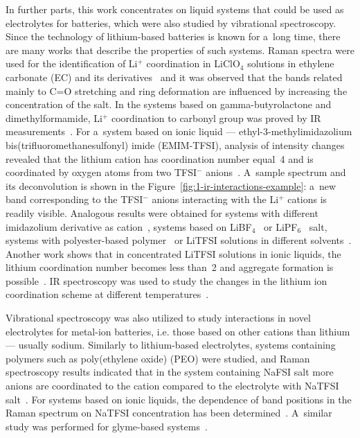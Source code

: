 In further parts, this work concentrates on liquid systems that could be used as electrolytes for batteries, which were also studied by vibrational spectroscopy. Since the technology of lithium-based batteries is known for a~long time, there are many works that describe the properties of such systems. Raman spectra were used for the identification of Li$^{+}$ coordination in LiClO$_4$ solutions in ethylene carbonate (EC) and its derivatives~\cite{li-interactions-1,li-interactions-2} and it was observed that the bands related mainly to C=O stretching and ring deformation are influenced by increasing the concentration of the salt. In the systems based on gamma-butyrolactone and dimethylformamide, Li$^{+}$ coordination to carbonyl group was proved by IR measurements~\cite{li-interactions-3}. For a~system based on ionic liquid --- ethyl-3-methylimidazolium bis(trifluoromethanesulfonyl) imide (EMIM-TFSI), analysis of intensity changes revealed that the lithium cation has coordination number equal~4 and is coordinated by oxygen atoms from two TFSI$^{-}$ anions~\cite{li-interactions-4}. A~sample spectrum and its deconvolution is shown in the Figure~\ref{fig:1-ir-interactions-example}: a~new band corresponding to the TFSI$^{-}$ anions interacting with the Li$^{+}$ cations is readily visible. Analogous results were obtained for systems with different imidazolium derivative as cation~\cite{li-interactions-7}, systems based on LiBF$_4$~\cite{li-interactions-8} or LiPF$_6$~\cite{li-interactions-9} salt, systems with polyester-based polymer~\cite{li-interactions-5} or LiTFSI solutions in different solvents~\cite{li-interactions-6}. Another work shows that in concentrated LiTFSI solutions in ionic liquids, the lithium coordination number becomes less than~2 and aggregate formation is possible~\cite{lib-vibrational-modeling,li-interactions-10}. IR spectroscopy was used to study the changes in the lithium ion coordination scheme at different temperatures~\cite{li-interactions-11}.

Vibrational spectroscopy was also utilized to study interactions in novel electrolytes for metal-ion batteries, i.e. those based on other cations than lithium --- usually sodium. Similarly to lithium-based electrolytes, systems containing polymers such as poly(ethylene oxide) (PEO) were studied, and Raman spectroscopy results indicated that in the system containing NaFSI salt more anions are coordinated to the cation compared to the electrolyte with NaTFSI salt~\cite{ir-interactions-9}. For systems based on ionic liquids, the dependence of band positions in the Raman spectrum on NaTFSI concentration has been determined~\cite{na-il-5}. A~similar study was performed for glyme-based systems~\cite{na-interactions-1}.